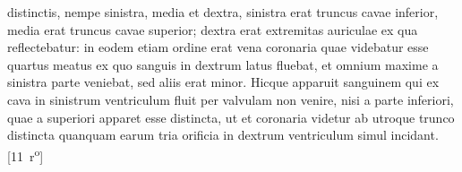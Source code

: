 distinctis, nempe sinistra, media et dextra, sinistra erat truncus cavae inferior, media erat truncus cavae superior; dextra erat extremitas auriculae ex qua reflectebatur: in eodem etiam ordine erat vena coronaria quae videbatur esse quartus meatus ex quo sanguis in dextrum latus fluebat, et omnium maxime a sinistra parte veniebat, sed aliis erat minor. Hicque apparuit sanguinem qui ex cava in sinistrum ventriculum fluit per valvulam non venire, nisi a
parte inferiori, quae a superiori apparet esse distincta, ut et coronaria videtur ab utroque trunco distincta quanquam earum tria orificia in dextrum ventriculum simul incidant.
[11~r\textsuperscript{o}]
\pend%
